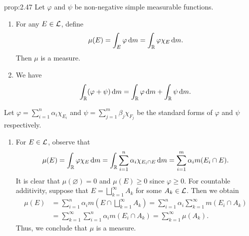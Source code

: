 \begin{prop}{prop:2.47}
    Let $\varphi$ and $\psi$ be non-negative simple measurable functions. 
    \begin{enumerate}[(1)]
        \item For any $E \in {\cal L}$, define 
        \[ \mu(E) = \int_E \varphi\,\mathrm{d} m = \int_{\mathbb{R}} \varphi\chi_E \,\mathrm{d} m. \] 
        Then $\mu$ is a measure. 
        \item We have 
        \[ \int_{\mathbb{R}} (\varphi + \psi)\,\mathrm{d} m = \int_{\mathbb{R}} \varphi\,\mathrm{d} m 
        + \int_{\mathbb{R}} \psi\,\mathrm{d} m. \] 
    \end{enumerate}
\end{prop}
\begin{pf}
    Let $\varphi = \sum_{i=1}^n \alpha_i \chi_{E_i}$ and $\psi = 
    \sum_{j=1}^m \beta_j \chi_{F_j}$ be the standard forms of 
    $\varphi$ and $\psi$ respectively. 
    \begin{enumerate}[(1)]
        \item For $E \in {\cal L}$, observe that 
        \[ \mu(E) = \int_{\mathbb{R}} \varphi\chi_E \,\mathrm{d} m = \int_{\mathbb{R}} 
        \sum_{i=1}^n \alpha_i \chi_{E_i \cap E}\,\mathrm{d} m 
        = \sum_{i=1}^m \alpha_i m(E_i \cap E). \] 
        It is clear that $\mu(\varnothing) = 0$ and $\mu(E) \geq 0$ 
        since $\varphi \geq 0$. For countable additivity, suppose that 
        $E = \bigsqcup_{k=1}^\infty A_k$ for some $A_k \in {\cal L}$. 
        Then we obtain 
        \begin{align*}
            \mu(E) &= \sum_{i=1}^n \alpha_i m\!\left( E \cap \bigsqcup_{k=1}^\infty A_k \right) 
            = \sum_{i=1}^n \alpha_i \sum_{k=1}^\infty m(E_i \cap A_k) \\
            &= \sum_{k=1}^\infty \sum_{i=1}^n \alpha_i m(E_i \cap A_k)  
            = \sum_{k=1}^\infty \mu(A_k). 
        \end{align*}
        Thus, we conclude that $\mu$ is a measure. 


\end{enumerate}
\end{pf}
